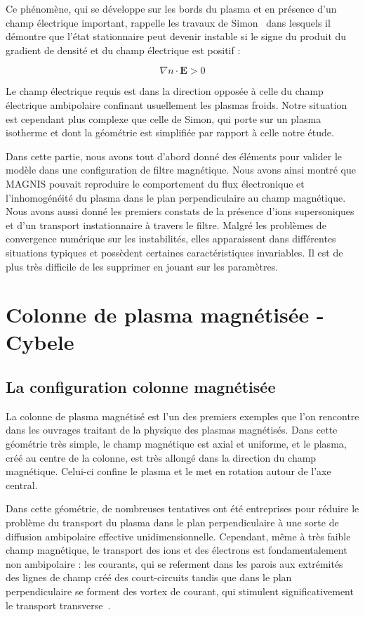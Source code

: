 \begin{refsection}
	 Ce
	phénomène, qui se développe sur les bords du plasma et en présence d'un champ électrique important, rappelle
	les travaux de Simon~\parencite{Simon63} dans lesquels il démontre que l'état
	stationnaire peut devenir instable si le signe du produit du
	gradient de densité et du champ électrique est positif :
	
	\begin{equation}
		\nabla n\cdot \mathbf E>0
	\end{equation}
	
	Le champ électrique requis est dans la direction opposée à celle du champ
	électrique ambipolaire confinant usuellement les plasmas froids. Notre
	situation est cependant plus complexe que celle de Simon, qui porte
	sur un plasma isotherme et dont la géométrie est simplifiée par rapport à
	celle notre étude.

	Dans cette partie, nous avons tout d'abord donné des éléments pour
	valider le modèle dans une configuration de filtre magnétique. Nous avons ainsi
	montré que MAGNIS pouvait reproduire le comportement du flux électronique et
	l'inhomogénéité du plasma dans le plan perpendiculaire au champ
	magnétique. Nous avons aussi donné les premiers constats de la présence d'ions
	supersoniques et d'un transport instationnaire à travers le filtre.
	Malgré les problèmes de convergence numérique sur les instabilités, elles
	apparaissent dans différentes situations typiques et possèdent certaines
	caractéristiques invariables. Il est de plus très difficile de les supprimer en
	jouant sur les paramètres.
	
\section{Colonne de plasma magnétisée - Cybele}
\subsection{La configuration colonne magnétisée}
La colonne de plasma magnétisé est l'un des premiers
exemples que l'on rencontre dans les ouvrages traitant de la physique des
plasmas magnétisés. Dans cette géométrie très simple, le champ
magnétique est axial et uniforme, et le plasma, créé au centre de la colonne,
est très allongé dans la direction du champ magnétique. Celui-ci confine le
plasma et le met en rotation autour de l'axe central.

Dans cette géométrie, de nombreuses tentatives ont été entreprises pour
réduire le problème du transport du plasma dans le plan perpendiculaire à une
sorte de diffusion ambipolaire effective unidimensionnelle.
Cependant, même à très faible champ magnétique, le transport des ions et des
électrons est fondamentalement non ambipolaire : les courants, qui se referment
dans les parois aux extrémités des lignes de champ créé des court-circuits
tandis que dans le plan perpendiculaire se forment des vortex de courant, qui
stimulent significativement le transport transverse~\parencite{Gurevich}.


\end{refsection}
